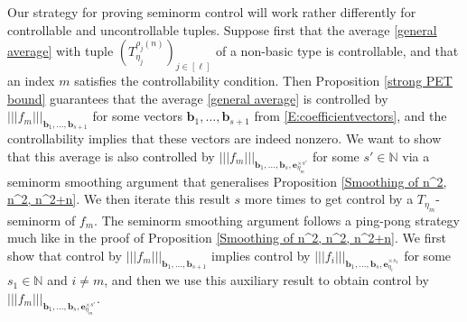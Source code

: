 \documentclass[11pt]{amsart}
\theoremstyle{definition}
\newcommand{\N}{{\mathbb N}}
\newcommand{\be}{{\mathbf{e}}}
\renewcommand{\b}{{\textbf{b}}}
\newcommand{\nnorm}[1]{\lvert\!|\!| #1|\!|\!\rvert}
\newcommand{\brac}[1]{\mathopen{}\left( #1 \mathclose{}\right)}
\begin{document}
Our strategy for proving seminorm control will work rather differently for controllable and uncontrollable tuples. Suppose first that the average \eqref{general average} with tuple $\brac{T_{\eta_j}^{\rho_j(n)}}_{j\in[\ell]}$ of a non-basic type is controllable, and that an index $m$ satisfies the controllability condition. Then Proposition \ref{strong PET bound} guarantees that the average \eqref{general average} is controlled by $\nnorm{f_m}_{\b_1, \ldots, \b_{s+1}}$ for some vectors $\b_1, \ldots, \b_{s+1}$ from \eqref{E:coefficientvectors}, and the controllability implies that these vectors are indeed nonzero. We want to show that this average is also controlled by $\nnorm{f_m}_{\b_1, \ldots, \b_{s}, \be_{\eta_m}^{\times s'}}$ for some $s'\in\N$ via a seminorm smoothing argument that generalises Proposition \ref{Smoothing of n^2, n^2, n^2+n}. We then iterate this result $s$ more times to get control by a $T_{\eta_m}$-seminorm of $f_m$. The seminorm smoothing argument follows a ping-pong strategy much like in the proof of Proposition \ref{Smoothing of n^2, n^2, n^2+n}. We first show that control by $\nnorm{f_m}_{\b_1, \ldots, \b_{s+1}}$ implies control by $\nnorm{f_i}_{\b_1, \ldots, \b_{s}, \be_{\eta_i}^{\times s_1}}$ for some $s_1\in\N$ and $i\neq m$, and then we use this auxiliary result to obtain control by $\nnorm{f_m}_{\b_1, \ldots, \b_{s}, \be_{\eta_m}^{\times s'}}$.
\end{document}

